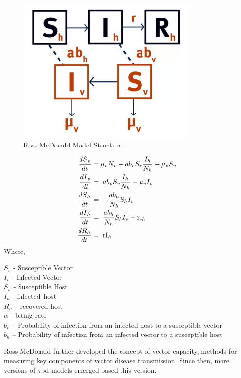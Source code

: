 \documentclass[a4paper, 12pt, twoside]{report}
\begin{document}
\begin{figure}[htpb]
	\centering
	\includegraphics[width=0.8\textwidth]{ross-mcdonald}
	\caption{Ross-McDonald Model Structure}
	\label{fig:ross-mcdonald}
\end{figure}

\begin{align}
	\frac{{dS}_v}{dt} & = \mu_v N_v - ab_vS_v\frac{I_h}{N_h} - \mu_v S_v \\
	\frac{{dI}_v}{dt} & =\ ab_vS_v\frac{I_h}{N_h}-\mu_v I_v              \\
	\frac{{dS}_h}{dt} & =\ -\frac{ab_h}{N_h}S_hI_v                       \\
	\frac{{dI}_h}{dt} & =\ \frac{ab_h}{N_h}S_hI_v-{\rm rI}_h             \\
	\frac{{dR}_h}{dt} & =\ {\rm rI}_h
\end{align}
Where,
\begin{centering}
	$S_v$ - Susceptible Vector  \\
	$I_v$ - Infected Vector\\
	$S_h$ - Susceptible Host\\
	$I_h$ - infected\ host\\
	$R_h$ – recovered host\\
	$\alpha$ - biting rate \\
	$b_v$ – Probability of infection from an infected host to a susceptible vector\\
	$b_h$ – Probability of infection from an infected vector to a susceptible host
\end{centering}

Ross-McDonald further developed the concept of vector capacity, methods for measuring key components of vector disease transmission.
Since then, more versions of \gls{vbd} models emerged based this version.
\end{document}
